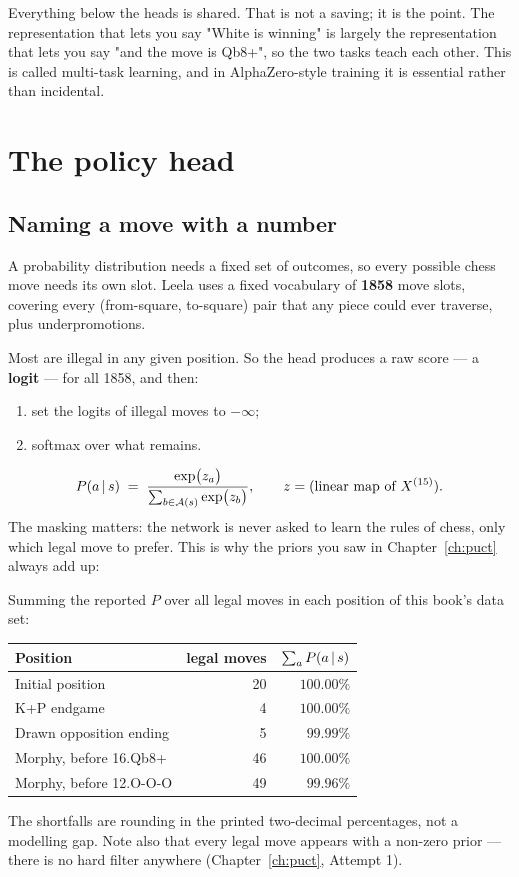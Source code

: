 Everything below the heads is shared. That is not a saving; it is the point. The
representation that lets you say "White is winning" is largely the representation that lets
you say "and the move is Qb8+", so the two tasks teach each other. This is called multi-task
learning, and in AlphaZero-style training it is essential rather than incidental.

\section{The policy head}

\subsection{Naming a move with a number}

A probability distribution needs a fixed set of outcomes, so every possible chess move needs
its own slot. Leela uses a fixed vocabulary of \textbf{1858} move slots, covering every
(from-square, to-square) pair that any piece could ever traverse, plus underpromotions.

Most are illegal in any given position. So the head produces a raw score --- a
\textbf{logit} --- for all 1858, and then:
\begin{enumerate}
\item set the logits of illegal moves to $-\infty$;
\item softmax over what remains.
\end{enumerate}
\begin{equation}
  \label{eq:policyhead}
  P(a \,|\, s) \;=\;
  \frac{\exp\bigl(z_a\bigr)}{\sum_{b \in \mathcal{A}(s)}\exp\bigl(z_b\bigr)},
  \qquad z = \text{(linear map of }X^{(15)}).
\end{equation}
The masking matters: the network is never asked to learn the rules of chess, only which legal
move to prefer. This is why the priors you saw in Chapter~\ref{ch:puct} always add up:

\begin{realdata}[title={Real engine output: the priors are a proper distribution}]
Summing the reported $P$ over all legal moves in each position of this book's data set:
\begin{center}
\begin{tabular}{@{}lrr@{}}
\toprule
Position & legal moves & $\sum_a P(a\,|\, s)$ \\
\midrule
Initial position & 20 & $100.00\%$ \\
K+P endgame & 4 & $100.00\%$ \\
Drawn opposition ending & 5 & $99.99\%$ \\
Morphy, before 16.Qb8+ & 46 & $100.00\%$ \\
Morphy, before 12.O-O-O & 49 & $99.96\%$ \\
\bottomrule
\end{tabular}
\end{center}
The shortfalls are rounding in the printed two-decimal percentages, not a modelling gap. Note
also that every legal move appears with a non-zero prior --- there is no hard filter anywhere
(Chapter~\ref{ch:puct}, Attempt 1).
\end{realdata}

